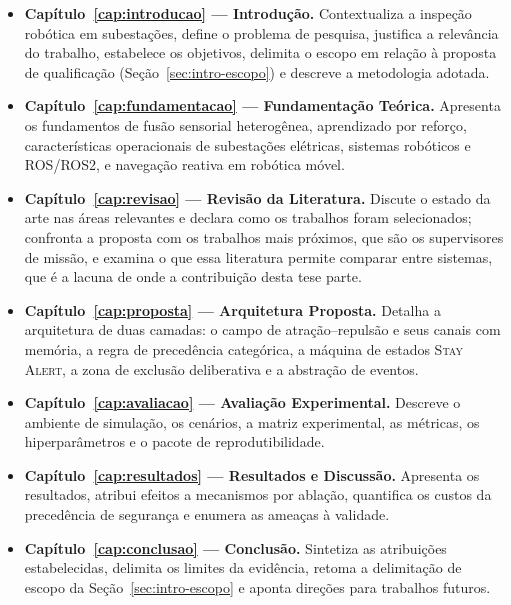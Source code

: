 \begin{itemize}
    \item \textbf{Capítulo~\ref{cap:introducao} --- Introdução.} Contextualiza a
    inspeção robótica em subestações, define o problema de pesquisa, justifica a
    relevância do trabalho, estabelece os objetivos, delimita o escopo em relação à
    proposta de qualificação (Seção~\ref{sec:intro-escopo}) e descreve a metodologia
    adotada.

    \item \textbf{Capítulo~\ref{cap:fundamentacao} --- Fundamentação Teórica.}
    Apresenta os fundamentos de fusão sensorial heterogênea, aprendizado por reforço,
    características operacionais de subestações elétricas, sistemas robóticos e
    ROS/ROS2, e navegação reativa em robótica móvel.

    \item \textbf{Capítulo~\ref{cap:revisao} --- Revisão da Literatura.}
    Discute o estado da arte nas áreas relevantes e declara como os trabalhos foram
    selecionados; confronta a proposta com os trabalhos mais próximos, que são os
    supervisores de missão, e examina o que essa literatura permite comparar entre
    sistemas, que é a lacuna de onde a contribuição desta tese parte.

    \item \textbf{Capítulo~\ref{cap:proposta} --- Arquitetura Proposta.} Detalha a
    arquitetura de duas camadas: o campo de atração--repulsão e seus canais com
    memória, a regra de precedência categórica, a máquina de estados
    \textsc{Stay Alert}, a zona de exclusão deliberativa e a abstração de eventos.

    \item \textbf{Capítulo~\ref{cap:avaliacao} --- Avaliação Experimental.} Descreve
    o ambiente de simulação, os cenários, a matriz experimental, as métricas, os
    hiperparâmetros e o pacote de reprodutibilidade.

    \item \textbf{Capítulo~\ref{cap:resultados} --- Resultados e Discussão.}
    Apresenta os resultados, atribui efeitos a mecanismos por ablação, quantifica os
    custos da precedência de segurança e enumera as ameaças à validade.

    \item \textbf{Capítulo~\ref{cap:conclusao} --- Conclusão.} Sintetiza as
    atribuições estabelecidas, delimita os limites da evidência, retoma a delimitação de escopo da
    Seção~\ref{sec:intro-escopo} e aponta direções para trabalhos futuros.
\end{itemize}
